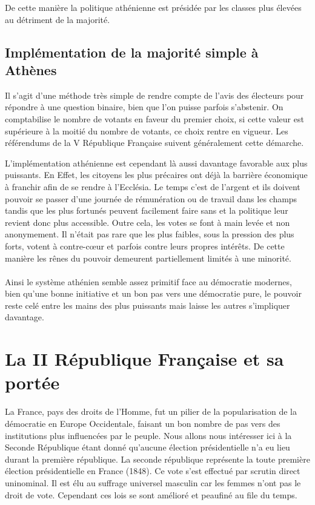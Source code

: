 \documentclass[11pt,a4paper]{report}
\begin{document}
De cette manière la politique athénienne est présidée par les classes plus élevées au détriment de la majorité.

\nocite{wiki:histdemo}
\subsection{Implémentation de la majorité simple à Athènes}
Il s'agit d'une méthode très simple de rendre compte de l'avis des électeurs pour répondre à une question binaire, bien que l'on puisse parfois s'abstenir.
On comptabilise le nombre de votants en faveur du premier choix, si cette valeur est supérieure à la moitié du nombre de votants, ce choix rentre en vigueur.
Les référendums de la V République Française suivent généralement cette démarche.

L'implémentation athénienne est cependant là aussi davantage favorable aux plus puissants.
En Effet, les citoyens les plus précaires ont déjà la barrière économique à franchir afin de se rendre à l'Ecclésia. Le temps c'est de l'argent et ils doivent pouvoir se passer d'une journée de rémunération ou de travail dans les champs tandis que les plus fortunés peuvent facilement faire sans et la politique leur revient donc plus accessible. Outre cela, les votes se font à main levée et non anonymement. Il n'était pas rare que les plus faibles, sous la pression des plus forts, votent à contre-cœur et parfois contre leurs propres intérêts. De cette manière les rênes du pouvoir demeurent partiellement limités à une minorité.

\paragraph{} %
Ainsi le système athénien semble assez primitif face au démocratie modernes, bien qu'une bonne initiative et un bon pas vers une démocratie pure, le pouvoir reste celé entre les mains des plus puissants mais laisse les autres s'impliquer davantage.


\section{La II République Française et sa portée}
La France, pays des droits de l’Homme, fut un pilier de la popularisation de la démocratie en Europe Occidentale, faisant un bon nombre de pas vers des institutions plus influencées par le peuple.
Nous allons nous intéresser ici à la Seconde République étant donné qu’aucune élection présidentielle n'a eu lieu durant la première république\nocite{wiki:deuxiemerep}.
La seconde république représente la toute première élection présidentielle en France (1848)\nocite{wiki:1848}.
Ce vote s'est effectué par scrutin direct uninominal.
Il est élu au suffrage universel masculin car les femmes n’ont pas le droit de vote. Cependant ces lois se sont amélioré et peaufiné au file du temps. \nocite{wiki:premiererep}
\end{document}
